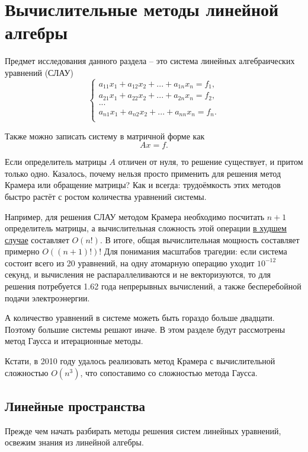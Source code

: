 \documentclass{article}
\begin{document}
\section{Вычислительные методы линейной алгебры}
Предмет исследования данного раздела -- это система линейных алгебраических
уравнений (СЛАУ)
\[
	\begin{cases}
		a_{11}x_1+a_{12}x_2+...+a_{1n}x_n=f_1, \\
		a_{21}x_1+a_{22}x_2+...+a_{2n}x_n=f_2, \\
		... \\
		a_{n1}x_1+a_{n2}x_2+...+a_{nn}x_n=f_n. \\
	\end{cases}
\]

Также можно записать систему в матричной форме как
\[Ax=f.\]

Если определитель матрицы $A$ отличен от нуля, то решение существует, и притом
только одно. Казалось, почему нельзя просто применить для решения метод Крамера
или обращение матрицы? Как и всегда: трудоёмкость этих методов быстро растёт с
ростом количества уравнений системы.

Например, для решения СЛАУ методом Крамера необходимо посчитать $n+1$
определитель матрицы, а вычислительная сложность этой операции \underline{в
худшем случае} составляет $O(n!)$. В итоге, общая вычислительная мощность
составляет примерно $O((n+1)!)$! Для понимания масштабов трагедии: если система
состоит всего из 20 уравнений, на одну атомарную операцию уходит $10^{-12}$
секунд, и вычисления не распараллеливаются и не векторизуются, то для решения
потребуется 1.62 года непрерывных вычислений, а также бесперебойной подачи
электроэнергии.

А количество уравнений в системе можеть быть гораздо больше двадцати. Поэтому
большие системы решают иначе. В этом разделе будут рассмотрены метод Гаусса и
итерационные методы.

Кстати, в 2010 году удалось реализовать метод Крамера с вычислительной
сложностью $O(n^3)$, что сопоставимо со сложностью метода Гаусса.

\newpage

\subsection{Линейные пространства}
Прежде чем начать разбирать методы решения систем линейных уравнений, освежим
знания из линейной алгебры.
\end{document}
